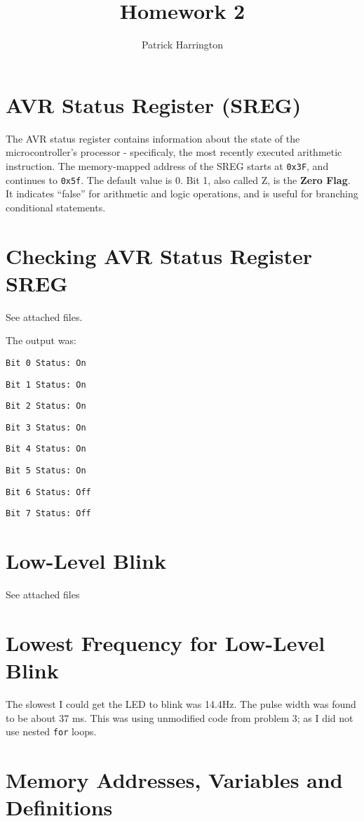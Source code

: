 \documentclass{hw}
\title{Homework 2}
\author{Patrick Harrington}
\begin{document}
\maketitle

\section{AVR Status Register (SREG)}
  The AVR status register contains information about the state of the
  microcontroller's processor - specificaly, the most recently executed arithmetic
  instruction. The memory-mapped address of the SREG starts at
  \texttt{0x3F}, and continues to \texttt{0x5f}. The default value is 
0. Bit 1, also called Z, is the \textbf{Zero Flag}. It indicates ``false'' for
arithmetic and logic operations, and is useful for branching conditional
statements.

\section{Checking AVR Status Register SREG}
See attached files.

The output was:

\texttt{Bit 0 Status: On}

\texttt{Bit 1 Status: On}

\texttt{Bit 2 Status: On}

\texttt{Bit 3 Status: On}

\texttt{Bit 4 Status: On}

\texttt{Bit 5 Status: On}

\texttt{Bit 6 Status: Off}

\texttt{Bit 7 Status: Off}

%

\section{Low-Level Blink}
See attached files
\section{Lowest Frequency for Low-Level Blink}
The slowest I could get the LED to blink was 14.4Hz. The pulse width was
found to be about 37 ms. This was using unmodified code from problem 3; as I
did not use nested \texttt{for} loops.
\section{Memory Addresses, Variables and Definitions}
\end{document}
